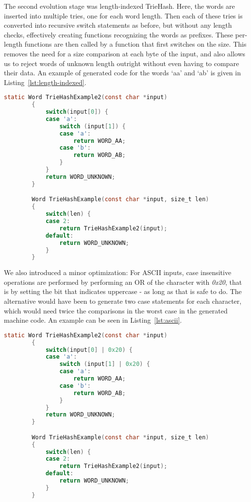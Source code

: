 \documentclass[parskip=half]{scrartcl}
\begin{document}
    The second evolution stage was length-indexed TrieHash. Here, the words
    are inserted into multiple tries, one for each word length. Then each of
    these tries is converted into recursive switch statements as before, but
    without any length checks, effectively creating functions recognizing the
    words as prefixes. These per-length functions are then called by a function
    that first switches on the size. This removes the need for a size comparison
    at each byte of the input, and also allows us to reject words of unknown
    length outright without even having to compare their data. An example of
    generated code for the words `aa' and `ab' is given in Listing~\ref{lst:length-indexed}.

    \begin{lstlisting}[language=C,gobble=8,label=lst:length-indexed,caption=Length-Indexed TrieHash,frame=tb]
        static Word TrieHashExample2(const char *input)
        {
            switch(input[0]) {
            case 'a':
                switch (input[1]) {
                case 'a':
                    return WORD_AA;
                case 'b':
                    return WORD_AB;
                }
            }
            return WORD_UNKNOWN;
        }

        Word TrieHashExample(const char *input, size_t len)
        {
            switch(len) {
            case 2:
                return TrieHashExample2(input);
            default:
                return WORD_UNKNOWN;
            }
        }
    \end{lstlisting}

    We also introduced a minor optimization: For ASCII inputs, case insensitive
    operations are performed by performing an OR of the character with \textit{0x20},
    that is by setting the bit that indicates uppercase - as long as that is
    safe to do. The alternative would have been to generate two case statements
    for each character, which would need twice the comparisons in the worst
    case in the generated machine code. An example can be seen in Listing~\ref{lst:ascii}.

        \begin{lstlisting}[language=C,gobble=8,label=lst:ascii,caption=Case-Insensitive Length-Indexed TrieHash,frame=tb]
        static Word TrieHashExample2(const char *input)
        {
            switch(input[0] | 0x20) {
            case 'a':
                switch (input[1] | 0x20) {
                case 'a':
                    return WORD_AA;
                case 'b':
                    return WORD_AB;
                }
            }
            return WORD_UNKNOWN;
        }

        Word TrieHashExample(const char *input, size_t len)
        {
            switch(len) {
            case 2:
                return TrieHashExample2(input);
            default:
                return WORD_UNKNOWN;
            }
        }
    \end{lstlisting}
\end{document}
